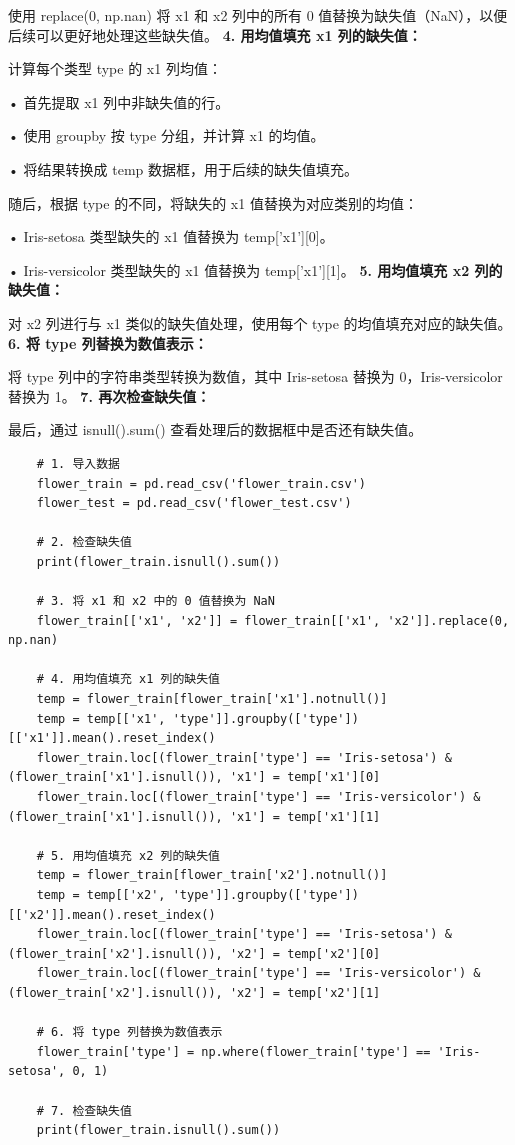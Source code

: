 \documentclass[12pt,a4paper,oneside]{article}
\begin{document}
使用 replace(0, np.nan) 将 x1 和 x2 列中的所有 0 值替换为缺失值（NaN），以便后续可以更好地处理这些缺失值。
\newline \textbf{4.	用均值填充 x1 列的缺失值：}

计算每个类型 type 的 x1 列均值：

	•	首先提取 x1 列中非缺失值的行。

	•	使用 groupby 按 type 分组，并计算 x1 的均值。

	•	将结果转换成 temp 数据框，用于后续的缺失值填充。

随后，根据 type 的不同，将缺失的 x1 值替换为对应类别的均值：

	•	Iris-setosa 类型缺失的 x1 值替换为 temp['x1'][0]。

	•	Iris-versicolor 类型缺失的 x1 值替换为 temp['x1'][1]。
    \newline 	\textbf{5.	用均值填充 x2 列的缺失值：}

对 x2 列进行与 x1 类似的缺失值处理，使用每个 type 的均值填充对应的缺失值。
\newline \textbf{6.	将 type 列替换为数值表示：}

将 type 列中的字符串类型转换为数值，其中 Iris-setosa 替换为 0，Iris-versicolor 替换为 1。
\newline \textbf{7.	再次检查缺失值：}

最后，通过 isnull().sum() 查看处理后的数据框中是否还有缺失值。

\begin{lstlisting}
    # 1. 导入数据
    flower_train = pd.read_csv('flower_train.csv')
    flower_test = pd.read_csv('flower_test.csv')
    
    # 2. 检查缺失值
    print(flower_train.isnull().sum())
    
    # 3. 将 x1 和 x2 中的 0 值替换为 NaN
    flower_train[['x1', 'x2']] = flower_train[['x1', 'x2']].replace(0, np.nan)
    
    # 4. 用均值填充 x1 列的缺失值
    temp = flower_train[flower_train['x1'].notnull()]
    temp = temp[['x1', 'type']].groupby(['type'])[['x1']].mean().reset_index()
    flower_train.loc[(flower_train['type'] == 'Iris-setosa') & (flower_train['x1'].isnull()), 'x1'] = temp['x1'][0]
    flower_train.loc[(flower_train['type'] == 'Iris-versicolor') & (flower_train['x1'].isnull()), 'x1'] = temp['x1'][1]
    
    # 5. 用均值填充 x2 列的缺失值
    temp = flower_train[flower_train['x2'].notnull()]
    temp = temp[['x2', 'type']].groupby(['type'])[['x2']].mean().reset_index()
    flower_train.loc[(flower_train['type'] == 'Iris-setosa') & (flower_train['x2'].isnull()), 'x2'] = temp['x2'][0]
    flower_train.loc[(flower_train['type'] == 'Iris-versicolor') & (flower_train['x2'].isnull()), 'x2'] = temp['x2'][1]
    
    # 6. 将 type 列替换为数值表示
    flower_train['type'] = np.where(flower_train['type'] == 'Iris-setosa', 0, 1)
    
    # 7. 检查缺失值
    print(flower_train.isnull().sum())
\end{lstlisting}
\end{document}
